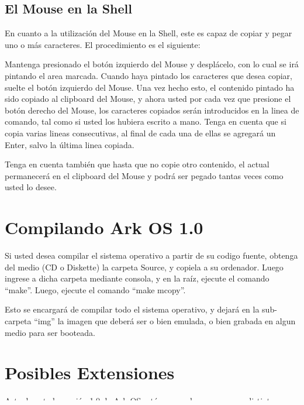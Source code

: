 \documentclass[a4paper,12pt]{article}
\begin{document}
\subsection{El Mouse en la Shell}
	En cuanto a la utilización del Mouse en la Shell, este es capaz de copiar y pegar uno o más caracteres.
	El procedimiento es el siguiente: 
	\par Mantenga presionado el botón izquierdo del Mouse y desplácelo, con lo cual se irá pintando el area marcada. Cuando haya pintado los caracteres que desea copiar, suelte el botón izquierdo del Mouse. Una vez hecho esto, el contenido pintado ha sido copiado al clipboard del Mouse, y ahora usted por cada vez que presione el botón derecho del Mouse, los caracteres copiados serán introducidos en la linea de comando, tal como si usted los hubiera escrito a mano. Tenga en cuenta que si copia varias lineas consecutivas, al final de cada una de ellas se agregará un Enter, salvo la última linea copiada.
	\par Tenga en cuenta también que hasta que no copie otro contenido, el actual permanecerá en el clipboard del Mouse y podrá ser pegado tantas veces como usted lo desee.

\section{Compilando Ark OS 1.0}
	Si usted desea compilar el sistema operativo a partir de su codigo fuente, obtenga del medio (CD o Diskette) la carpeta Source, y copiela a su ordenador. Luego ingrese a dicha carpeta mediante consola, y en la raíz, ejecute el comando “make”.  Luego, ejecute el comando “make mcopy”. 
	\par Esto se encargará de compilar todo el sistema operativo, y dejará en la sub-carpeta “img” la imagen que deberá ser o bien emulada, o bien grabada en algun medio para ser booteada.

\section{Posibles Extensiones}
	Actualmente la versión 1.0 de Ark OS está preparada para agregar distintas features sin necesidad de modificar grandes cantidades de código fuente gracias a la flexibilidad del mismo.
	\subsection{Copiado de líneas a Colores}
	Por cuestiones de tiempo en relación a la fecha de entrega, la versión 1.0 no soporta copia de los colores de la pantalla. Es decir al copiar un string que tiene colores cuando se procede al pegado, este se pega con el color default de la pantalla.
	\par En realidad el sistema soporta el copiado pero en esta versión esta función está deshabilitada debido a un BUG a la hora de recuperar los atributos desde el archivo inatt.
\end{document}
